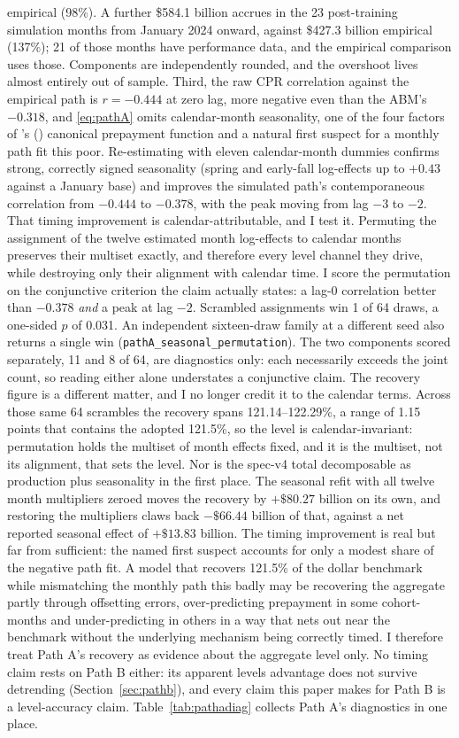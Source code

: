 \documentclass[12pt]{article}
\newcommand{\citepos}[1]{\citeauthor{#1}'s (\citeyear{#1})}
\begin{document}
empirical (98\%). A further \$584.1 billion accrues in the 23 post-training simulation months from January 2024 onward, against \$427.3 billion empirical (137\%); 21 of those months have performance data, and the empirical comparison uses those. Components are independently rounded, and the overshoot lives almost entirely out of sample. Third, the raw CPR correlation against the empirical path is $r = -0.444$ at zero lag, more negative even than the ABM's $-0.318$, and \eqref{eq:pathA} omits calendar-month seasonality, one of the four factors of \citepos{richard1989} canonical prepayment function and a natural first suspect for a monthly path fit this poor. Re-estimating with eleven calendar-month dummies confirms strong, correctly signed seasonality (spring and early-fall log-effects up to $+0.43$ against a January base) and improves the simulated path's contemporaneous correlation from $-0.444$ to $-0.378$, with the peak moving from lag $-3$ to $-2$. That timing improvement is calendar-attributable, and I test it. Permuting the assignment of the twelve estimated month log-effects to calendar months preserves their multiset exactly, and therefore every level channel they drive, while destroying only their alignment with calendar time. I score the permutation on the conjunctive criterion the claim actually states: a lag-0 correlation better than $-0.378$ \emph{and} a peak at lag $-2$. Scrambled assignments win 1 of 64 draws, a one-sided $p$ of 0.031. An independent sixteen-draw family at a different seed also returns a single win (\texttt{pathA\_seasonal\_permutation}). The two components scored separately, 11 and 8 of 64, are diagnostics only: each necessarily exceeds the joint count, so reading either alone understates a conjunctive claim. The recovery figure is a different matter, and I no longer credit it to the calendar terms. Across those same 64 scrambles the recovery spans 121.14--122.29\%, a range of 1.15 points that contains the adopted 121.5\%, so the level is calendar-invariant: permutation holds the multiset of month effects fixed, and it is the multiset, not its alignment, that sets the level. Nor is the spec-v4 total decomposable as production plus seasonality in the first place. The seasonal refit with all twelve month multipliers zeroed moves the recovery by $+\$80.27$ billion on its own, and restoring the multipliers claws back $-\$66.44$ billion of that, against a net reported seasonal effect of $+\$13.83$ billion. The timing improvement is real but far from sufficient: the named first suspect accounts for only a modest share of the negative path fit. A model that recovers 121.5\% of the dollar benchmark while mismatching the monthly path this badly may be recovering the aggregate partly through offsetting errors, over-predicting prepayment in some cohort-months and under-predicting in others in a way that nets out near the benchmark without the underlying mechanism being correctly timed. I therefore treat Path A's recovery as evidence about the aggregate level only. No timing claim rests on Path B either: its apparent levels advantage does not survive detrending (Section~\ref{sec:pathb}), and every claim this paper makes for Path B is a level-accuracy claim. Table~\ref{tab:pathadiag} collects Path A's diagnostics in one place.
\end{document}
